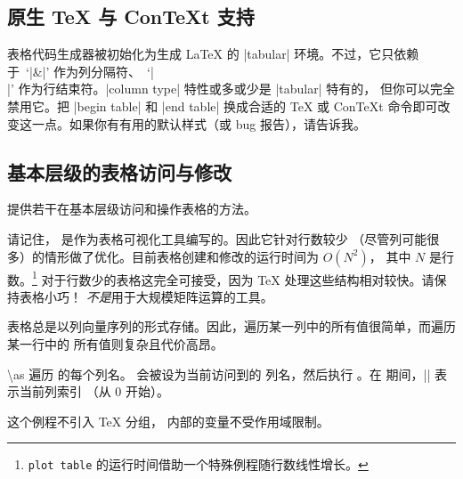 \documentclass[a4paper,doc2]{ltxdoc}
\begin{document}
\subsection{原生 \TeX{} 与 Con\TeX{}t 支持}
\label{sec:pgfplotstable:context}

表格代码生成器被初始化为生成 \LaTeX{} 的 |tabular| 环境。不过，它只依赖于~`|&|'
作为列分隔符、~`|\\|' 作为行结束符。|column type| 特性或多或少是 |tabular| 特有的，
但你可以完全禁用它。把 |begin table| 和 |end table| 换成合适的 \TeX{} 或
Con\TeX{}t 命令即可改变这一点。如果你有有用的默认样式（或 bug 报告），请告诉我。


\subsection{基本层级的表格访问与修改}

\PGFPlotstable{} 提供若干在基本层级访问和操作表格的方法。

请记住，\PGFPlotstable{} 是作为表格可视化工具编写的。因此它针对行数较少
（尽管列可能很多）的情形做了优化。目前表格创建和修改的运行时间为 $O(N^2)$，
其中 $N$ 是行数。\footnote{\texttt{plot table} 的运行时间借助一个特殊例程随行数线性增长。}
对于行数少的表格这完全可接受，因为 \TeX{} 处理这些结构相对较快。请保持表格小巧！
\PGFPlotstable{} \emph{不是}用于大规模矩阵运算的工具。

表格总是以列向量序列的形式存储。因此，遍历某一列中的所有值很简单，而遍历某一行中的
所有值则复杂且代价高昂。

\begin{command}{\pgfplotstableforeachcolumn{}\textbackslash as}
    遍历  的每个列名。 会被设为当前访问到的
    列名，然后执行 。在  期间，|\pgfplotstablecol| 表示当前列索引
    （从 0 开始）。
\begin{codeexample}[]
\begin{minipage}{0.8\linewidth}
\loadedtable
\pgfplotstableforeachcolumn\loadedtable\as{}
\end{minipage}
\end{codeexample}

    这个例程不引入 \TeX{} 分组， 内部的变量不受作用域限制。
\end{command}
\end{document}
